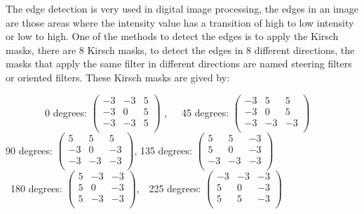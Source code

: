 \documentclass[a4paper]{article}
\begin{document}
The edge detection is very used in digital image processing, the edges in an image are those areas where the intensity value has a  transition of high to low intensity or low to high. One of the methods to detect the edges is to apply the Kirsch masks, there are 8 Kirsch masks, to detect the edges in 8 different directions, the masks that apply the same filter in different directions are named steering filters or oriented filters. These Kirsch masks are gived by:\\
\begin{centering}
\ \ \ \ \ \ \ \ 0 degrees: \begin{math}
   \begin{pmatrix} 
   -3 & -3 & 5 \\ 
   -3 & 0 & 5 \\
   -3 & -3 & 5 \\ 
   \end{pmatrix}
\end{math} ,\ \ \  45 degrees: \begin{math}
   \begin{pmatrix} 
   -3 & 5 & 5 \\ 
   -3 & 0 & 5 \\
   -3 & -3 & -3 \\ 
   \end{pmatrix}
\end{math}\\
90 degrees: \begin{math}
   \begin{pmatrix} 
   5 & 5 & 5 \\ 
   -3 & 0 & -3 \\
   -3 & -3 & -3 \\ 
   \end{pmatrix}
\end{math}, 135 degrees: \begin{math}
   \begin{pmatrix} 
   5 & 5 & -3 \\ 
   5 & 0 & -3 \\
   -3 & -3 & -3 \\ 
   \end{pmatrix}
\end{math}\\

\ 180 degrees: \begin{math}
   \begin{pmatrix} 
   5 & -3 & -3 \\ 
   5 & 0 & -3 \\
   5 & -3 & -3 \\ 
   \end{pmatrix}
\end{math},\ \  225 degrees: \begin{math}
   \begin{pmatrix} 
   -3 & -3 & -3 \\ 
   5 & 0 & -3 \\
   5 & 5 & -3 \\ 
   \end{pmatrix}
\end{math}\\


\end{centering}
\end{document}
